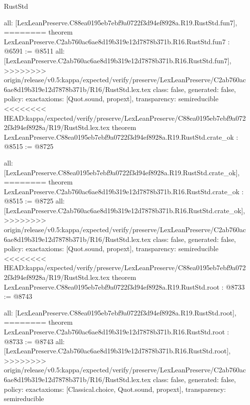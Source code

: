 \begin{lexlean}{RustStd}
\begin{coremodule}
{\begin{coremodule}
{{{{{{{{{{  all: [LexLeanPreserve.C88ea0195eb7ebf9a0722f3d94ef8928a.R19.RustStd.fun7],
========
theorem LexLeanPreserve.C2ab760ac6ae8d19b319e12d7878b371b.R16.RustStd.fun7 : @6591 := @8511 {
  all: [LexLeanPreserve.C2ab760ac6ae8d19b319e12d7878b371b.R16.RustStd.fun7],
>>>>>>>> origin/release/v0.5:kappa/expected/verify/preserve/LexLeanPreserve/C2ab760ac6ae8d19b319e12d7878b371b/R16/RustStd.lex.tex
  class: false,
  generated: false,
  policy: exact{axioms: [Quot.sound, propext]},
  transparency: semireducible
}
<<<<<<<< HEAD:kappa/expected/verify/preserve/LexLeanPreserve/C88ea0195eb7ebf9a0722f3d94ef8928a/R19/RustStd.lex.tex
theorem LexLeanPreserve.C88ea0195eb7ebf9a0722f3d94ef8928a.R19.RustStd.crate_ok : @8515 := @8725 {
  all: [LexLeanPreserve.C88ea0195eb7ebf9a0722f3d94ef8928a.R19.RustStd.crate_ok],
========
theorem LexLeanPreserve.C2ab760ac6ae8d19b319e12d7878b371b.R16.RustStd.crate_ok : @8515 := @8725 {
  all: [LexLeanPreserve.C2ab760ac6ae8d19b319e12d7878b371b.R16.RustStd.crate_ok],
>>>>>>>> origin/release/v0.5:kappa/expected/verify/preserve/LexLeanPreserve/C2ab760ac6ae8d19b319e12d7878b371b/R16/RustStd.lex.tex
  class: false,
  generated: false,
  policy: exact{axioms: [Quot.sound, propext]},
  transparency: semireducible
}
<<<<<<<< HEAD:kappa/expected/verify/preserve/LexLeanPreserve/C88ea0195eb7ebf9a0722f3d94ef8928a/R19/RustStd.lex.tex
theorem LexLeanPreserve.C88ea0195eb7ebf9a0722f3d94ef8928a.R19.RustStd.root : @8733 := @8743 {
  all: [LexLeanPreserve.C88ea0195eb7ebf9a0722f3d94ef8928a.R19.RustStd.root],
========
theorem LexLeanPreserve.C2ab760ac6ae8d19b319e12d7878b371b.R16.RustStd.root : @8733 := @8743 {
  all: [LexLeanPreserve.C2ab760ac6ae8d19b319e12d7878b371b.R16.RustStd.root],
>>>>>>>> origin/release/v0.5:kappa/expected/verify/preserve/LexLeanPreserve/C2ab760ac6ae8d19b319e12d7878b371b/R16/RustStd.lex.tex
  class: false,
  generated: false,
  policy: exact{axioms: [Classical.choice, Quot.sound, propext]},
  transparency: semireducible
}

}}}}}}}}}}}}
\end{coremodule}}
\end{coremodule}
\end{lexlean}
